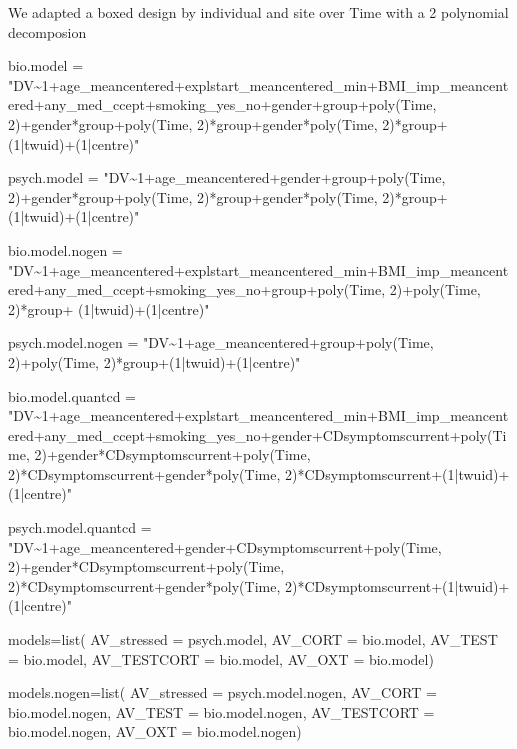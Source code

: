 \documentclass[
]{article}
\newenvironment{Shaded}{\begin{snugshade}}{\end{snugshade}}
\newcommand{\AttributeTok}[1]{\textcolor[rgb]{0.77,0.63,0.00}{#1}}
\newcommand{\FunctionTok}[1]{\textcolor[rgb]{0.00,0.00,0.00}{#1}}
\newcommand{\NormalTok}[1]{#1}
\newcommand{\OtherTok}[1]{\textcolor[rgb]{0.56,0.35,0.01}{#1}}
\newcommand{\StringTok}[1]{\textcolor[rgb]{0.31,0.60,0.02}{#1}}
\begin{document}
We adapted a boxed design by individual and site over Time with a 2
polynomial decomposion

\begin{Shaded}
\begin{Highlighting}[]
\NormalTok{bio.model }\OtherTok{=} \StringTok{"DV\textasciitilde{}1+age\_meancentered+explstart\_meancentered\_min+BMI\_imp\_meancentered+any\_med\_ccept+smoking\_yes\_no+gender+group+poly(Time, 2)+gender*group+poly(Time, 2)*group+gender*poly(Time, 2)*group+(1|twuid)+(1|centre)"}

\NormalTok{psych.model }\OtherTok{=} \StringTok{"DV\textasciitilde{}1+age\_meancentered+gender+group+poly(Time, 2)+gender*group+poly(Time, 2)*group+gender*poly(Time, 2)*group+(1|twuid)+(1|centre)"}


\NormalTok{bio.model.nogen }\OtherTok{=} \StringTok{"DV\textasciitilde{}1+age\_meancentered+explstart\_meancentered\_min+BMI\_imp\_meancentered+any\_med\_ccept+smoking\_yes\_no+group+poly(Time, 2)+poly(Time, 2)*group+}
\StringTok{(1|twuid)+(1|centre)"}

\NormalTok{psych.model.nogen }\OtherTok{=} \StringTok{"DV\textasciitilde{}1+age\_meancentered+group+poly(Time, 2)+poly(Time, 2)*group+(1|twuid)+(1|centre)"}


\NormalTok{bio.model.quantcd }\OtherTok{=} \StringTok{"DV\textasciitilde{}1+age\_meancentered+explstart\_meancentered\_min+BMI\_imp\_meancentered+any\_med\_ccept+smoking\_yes\_no+gender+CDsymptomscurrent+poly(Time, 2)+gender*CDsymptomscurrent+poly(Time, 2)*CDsymptomscurrent+gender*poly(Time, 2)*CDsymptomscurrent+(1|twuid)+(1|centre)"}

\NormalTok{psych.model.quantcd }\OtherTok{=} \StringTok{"DV\textasciitilde{}1+age\_meancentered+gender+CDsymptomscurrent+poly(Time, 2)+gender*CDsymptomscurrent+poly(Time, 2)*CDsymptomscurrent+gender*poly(Time, 2)*CDsymptomscurrent+(1|twuid)+(1|centre)"}



\NormalTok{models}\OtherTok{=}\FunctionTok{list}\NormalTok{(}
  \AttributeTok{AV\_stressed =}\NormalTok{ psych.model,}
  \AttributeTok{AV\_CORT =}\NormalTok{ bio.model,}
  \AttributeTok{AV\_TEST =}\NormalTok{ bio.model,}
  \AttributeTok{AV\_TESTCORT =}\NormalTok{ bio.model,}
  \AttributeTok{AV\_OXT =}\NormalTok{ bio.model)}

\NormalTok{models.nogen}\OtherTok{=}\FunctionTok{list}\NormalTok{(}
  \AttributeTok{AV\_stressed =}\NormalTok{ psych.model.nogen,}
  \AttributeTok{AV\_CORT =}\NormalTok{ bio.model.nogen,}
  \AttributeTok{AV\_TEST =}\NormalTok{ bio.model.nogen,}
  \AttributeTok{AV\_TESTCORT =}\NormalTok{ bio.model.nogen,}
  \AttributeTok{AV\_OXT =}\NormalTok{ bio.model.nogen)}



\end{Highlighting}
\end{Shaded}
\end{document}
